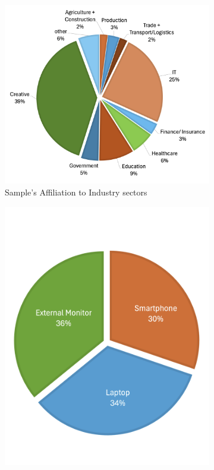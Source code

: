\documentclass[
  a4paper,  %
  twoside,  %
  bibliography=totoc,
  headsepline,
  cleardoublepage=empty,
  parskip=half,
  draft=false
]{scrbook}
\begin{document}
\begin{figure}[h]
  \centering
  \begin{subfigure}{0.58\textwidth}
    \includegraphics[width=\linewidth]{graphics/images/statistics/piechart-sectors.png}
    \caption{Sample's Affiliation to Industry sectors}
    \label{fig:piechart-sectors}
  \end{subfigure}
  \begin{subfigure}{0.38\textwidth}
    \includegraphics[width=\linewidth]{graphics/images/statistics/piechart-devices.png}

\end{subfigure}
\end{figure}
\end{document}
